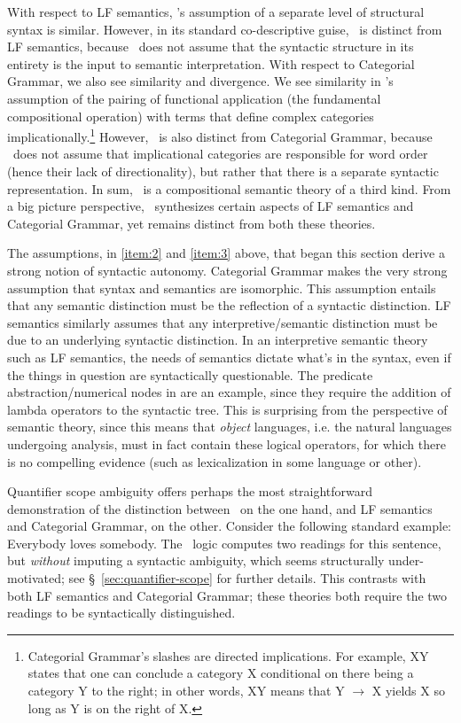 \documentclass[output=paper,hidelinks]{langscibook}
\begin{document}
With respect to LF semantics, 
\glue's assumption of a separate level of structural syntax is similar. However, in its standard co-descriptive guise, \glue\
is distinct from LF semantics, because \glue\ does not assume that the
syntactic structure in its entirety is the input to semantic
interpretation. With respect to Categorial Grammar, we also see
similarity and divergence. We see similarity in \glue's assumption
of the pairing of functional application (the fundamental
compositional operation) with terms that define complex categories
implicationally.\footnote{Categorial Grammar's slashes are directed
  implications. 
  For example, X{\fs}Y states
  that one can conclude a category X conditional on there being a
  category Y to the right; in other words, X{\fs}Y means that Y $\rightarrow$ X yields X
  so long as Y is on the right of X.} However, \glue\ is also distinct from
Categorial Grammar, because \glue\ does not assume that implicational
categories are responsible for word order (hence their lack of
directionality), but rather that there is a separate syntactic
representation. In sum, \glue\ is a compositional semantic theory of a
third kind. From a big picture perspective, \glue\ synthesizes certain
aspects of LF semantics and Categorial Grammar, yet remains distinct
from both these theories. 

\largerpage[-2]
The assumptions, in \ref{item:2} and \ref{item:3} above, that began this section 
derive a strong notion of syntactic autonomy. Categorial Grammar makes
the very strong assumption that syntax and semantics are
isomorphic. This assumption entails that any semantic distinction must
be the reflection of  a syntactic
distinction. LF semantics similarly assumes that any
interpretive/semantic distinction 
must be due to an underlying syntactic distinction. In an
interpretive semantic theory such as LF semantics, the needs
of semantics dictate what's in the syntax, even if the things in
question are syntactically questionable. The predicate abstraction/numerical nodes in
\citet[186]{heim1998semantics} are an example, since they require the
addition of lambda operators to the syntactic tree. This is surprising
from the perspective of semantic theory, since this means that 
\emph{object} languages, i.e. the natural languages undergoing
analysis, must in fact contain these logical operators, for which
there is no compelling evidence (such as lexicalization in some
language or other). 

\newpage
Quantifier scope ambiguity offers perhaps the most straightforward
demonstration of the distinction between \glue\, on the one hand, and
LF semantics and Categorial Grammar, on the other. Consider the
following standard example:
\ea
\label{ex:scope} Everybody loves somebody. 
\z
%
The \glue\ logic computes two readings for this sentence, but
\emph{without} imputing a syntactic ambiguity, which seems
structurally under-motivated; see \S~\ref{sec:quantifier-scope} for
further details. This contrasts
with both LF semantics and Categorial Grammar; these theories both require the
two readings to be {syntactically} distinguished. 
\end{document}
